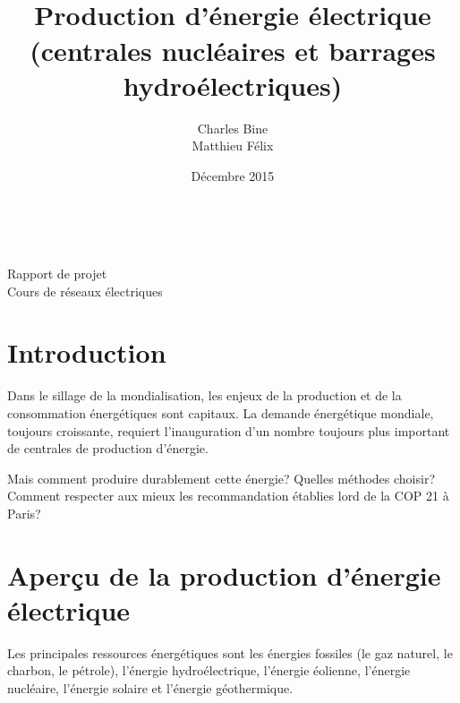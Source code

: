 \documentclass[12pt,a4paper,oneside,openany]{memoir}
\author{Charles Bine\\Matthieu Félix}
\title{\\Production d'énergie électrique (centrales nucléaires et barrages hydroélectriques)}
\date{Décembre 2015}
\begin{document}
	
\keepthetitle
\begin{titlingpage}
\noindent
\begin{minipage}[t]{0.5\textwidth} \begin{flushleft}
\theauthor \\ \thedate
\end{flushleft} \end{minipage}
\begin{minipage}[t]{0.5\textwidth} \begin{flushright}
Rapport de projet \\
Cours de réseaux électriques
\end{flushright} \end{minipage}

\vspace{3cm}
\begin{center}
{\LARGE \textbf{\thetitle}}
\end{center}
\vspace{3cm}

\end{titlingpage}

\addtolength{\marginparwidth}{11mm}
\abnormalparskip{4mm}

\clearpage

\tableofcontents
\listoffigures
\listoftables
\clearpage



\chapter{Introduction}

Dans le sillage de la mondialisation, les enjeux de la production et de la consommation énergétiques sont capitaux. La demande énergétique mondiale, toujours croissante, requiert l'inauguration d'un nombre toujours plus important de centrales de production d'énergie.

Mais comment produire durablement cette énergie? Quelles méthodes choisir? Comment respecter aux mieux les recommandation établies lord de la COP 21 à Paris? 


\chapter{Aperçu de la production d'énergie électrique}

Les principales ressources énergétiques sont les énergies fossiles (le gaz naturel, le charbon, le pétrole), l’énergie hydroélectrique, l’énergie éolienne, l’énergie nucléaire, l’énergie solaire et l'énergie géothermique. 
\end{document}
